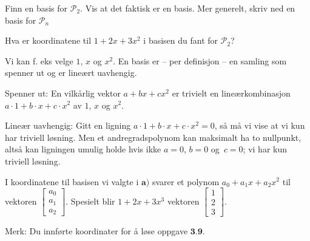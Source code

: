 \begin{oppgave}

\begin{punkt}
Finn en basis for $\mathcal{P}_2$. Vis at det faktisk er en basis. Mer generelt, skriv ned en basis for $\mathcal{P}_n$
\end{punkt}

\begin{punkt}
Hva er koordinatene til $1+2x+3x^2$ i basisen du fant for $\mathcal{P}_2$?
\end{punkt}

\end{oppgave}

\begin{losning}


\begin{punkt}
Vi kan f. eks velge $1$, $x$ og $x^2$. En basis er -- per definisjon -- en samling som spenner ut og er lineært uavhengig.

\noindent
Spenner ut: En vilkårlig vektor $a+bx+cx^2$ er trivielt en lineærkombinasjon $a\cdot 1+b\cdot x+c\cdot x^2$ av $1$, $x$ og $x^2$.

\noindent
Lineær uavhengig: Gitt en ligning $a\cdot 1+b\cdot x+c\cdot x^2=0$, så må vi vise at vi kun har triviell løsning. Men et andregradspolynom kan maksimalt ha to nullpunkt, altså kan ligningen umulig holde hvis ikke $a=0$, $b=0$ og~$c=0$; vi har kun triviell løsning.
\end{punkt}


\begin{punkt}
I koordinatene til basisen vi valgte i $\textbf{a)}$ svarer et polynom $a_0+a_1x+a_2x^2$ til vektoren $\begin{bmatrix}
a_0\\
a_1\\
a_2
\end{bmatrix}.$ Spesielt blir $1+2x+3x^3$ vektoren $\begin{bmatrix}
1\\
2\\
3
\end{bmatrix}.$


\noindent
Merk: Du innførte koordinater for å løse oppgave $\textbf{3.9.}$
\end{punkt}

\end{losning}


